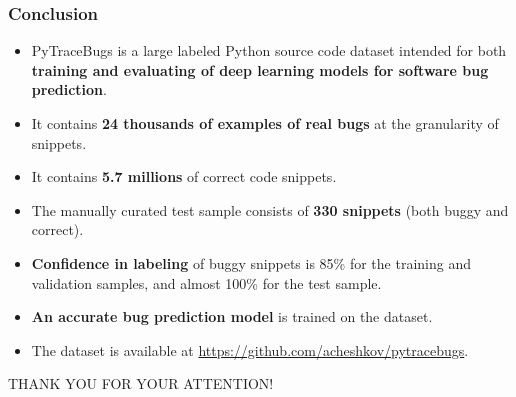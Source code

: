 \documentclass{beamer}
\begin{document}
\begin{frame}
\frametitle{Conclusion}

{\small
\begin{itemize}
\item PyTraceBugs is a large labeled Python source code dataset intended for both \textbf{training and evaluating of deep learning models
for software bug prediction}. 
\item It contains \textbf{24 thousands of examples of real bugs} at the granularity of
snippets.%
\item It contains \textbf{5.7 millions} of correct code snippets.
\item The manually curated test sample consists of \textbf{330 snippets} (both buggy and correct).
\item \textbf{Confidence in labeling} of buggy snippets is 85\% for the training and validation samples, and almost 100\% for the test sample.
\item \textbf{An accurate bug prediction model} is trained on the dataset.
\item The dataset is available at \url{https://github.com/acheshkov/pytracebugs}.
\end{itemize}
}

\end{frame}

\begin{frame}

{\Large
\begin{center}
THANK YOU FOR YOUR ATTENTION!
\end{center}}



\end{frame}
\end{document}
